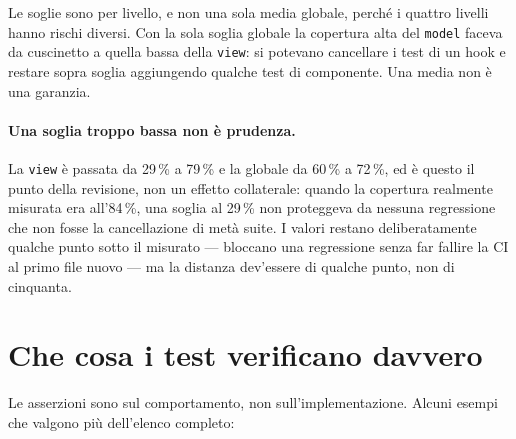 \documentclass[11pt,a4paper]{report}
\begin{document}
Le soglie sono per livello, e non una sola media globale, perch\'e i quattro
livelli hanno rischi diversi. Con la sola soglia globale la copertura alta
del \texttt{model} faceva da cuscinetto a quella bassa della \texttt{view}: si
potevano cancellare i test di un hook e restare sopra soglia aggiungendo
qualche test di componente. Una media non \`e una garanzia.

\paragraph{Una soglia troppo bassa non \`e prudenza.} La \texttt{view} \`e
passata da 29\,\% a 79\,\% e la globale da 60\,\% a 72\,\%, ed \`e questo il
punto della revisione, non un effetto collaterale: quando la copertura
realmente misurata era all'84\,\%, una soglia al 29\,\% non proteggeva da
nessuna regressione che non fosse la cancellazione di met\`a suite. I valori
restano deliberatamente qualche punto sotto il misurato --- bloccano una
regressione senza far fallire la CI al primo file nuovo --- ma la distanza
dev'essere di qualche punto, non di cinquanta.

\section{Che cosa i test verificano davvero}

Le asserzioni sono sul comportamento, non sull'implementazione. Alcuni esempi
che valgono pi\`u dell'elenco completo:
\end{document}
